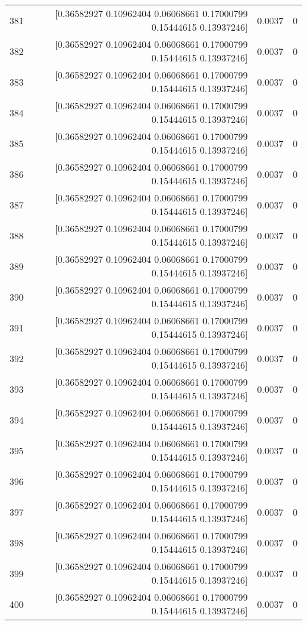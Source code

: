 \begin{longtable}{lrrr}
381 & [0.36582927 0.10962404 0.06068661 0.17000799 0.15444615 0.13937246] & 0.0037 & 0 \\
382 & [0.36582927 0.10962404 0.06068661 0.17000799 0.15444615 0.13937246] & 0.0037 & 0 \\
383 & [0.36582927 0.10962404 0.06068661 0.17000799 0.15444615 0.13937246] & 0.0037 & 0 \\
384 & [0.36582927 0.10962404 0.06068661 0.17000799 0.15444615 0.13937246] & 0.0037 & 0 \\
385 & [0.36582927 0.10962404 0.06068661 0.17000799 0.15444615 0.13937246] & 0.0037 & 0 \\
386 & [0.36582927 0.10962404 0.06068661 0.17000799 0.15444615 0.13937246] & 0.0037 & 0 \\
387 & [0.36582927 0.10962404 0.06068661 0.17000799 0.15444615 0.13937246] & 0.0037 & 0 \\
388 & [0.36582927 0.10962404 0.06068661 0.17000799 0.15444615 0.13937246] & 0.0037 & 0 \\
389 & [0.36582927 0.10962404 0.06068661 0.17000799 0.15444615 0.13937246] & 0.0037 & 0 \\
390 & [0.36582927 0.10962404 0.06068661 0.17000799 0.15444615 0.13937246] & 0.0037 & 0 \\
391 & [0.36582927 0.10962404 0.06068661 0.17000799 0.15444615 0.13937246] & 0.0037 & 0 \\
392 & [0.36582927 0.10962404 0.06068661 0.17000799 0.15444615 0.13937246] & 0.0037 & 0 \\
393 & [0.36582927 0.10962404 0.06068661 0.17000799 0.15444615 0.13937246] & 0.0037 & 0 \\
394 & [0.36582927 0.10962404 0.06068661 0.17000799 0.15444615 0.13937246] & 0.0037 & 0 \\
395 & [0.36582927 0.10962404 0.06068661 0.17000799 0.15444615 0.13937246] & 0.0037 & 0 \\
396 & [0.36582927 0.10962404 0.06068661 0.17000799 0.15444615 0.13937246] & 0.0037 & 0 \\
397 & [0.36582927 0.10962404 0.06068661 0.17000799 0.15444615 0.13937246] & 0.0037 & 0 \\
398 & [0.36582927 0.10962404 0.06068661 0.17000799 0.15444615 0.13937246] & 0.0037 & 0 \\
399 & [0.36582927 0.10962404 0.06068661 0.17000799 0.15444615 0.13937246] & 0.0037 & 0 \\
400 & [0.36582927 0.10962404 0.06068661 0.17000799 0.15444615 0.13937246] & 0.0037 & 0 \\

\end{longtable}
